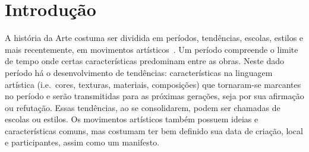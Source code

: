 



\chapter{Introdução}
\label{cap:intro} 

A história da Arte costuma ser dividida em períodos, tendências,
escolas, estilos e mais recentemente, em movimentos
artísticos~\cite{dempsey}. Um período compreende o limite de tempo
onde certas características predominam entre as obras. Neste dado
período há o desenvolvimento de tendências: características na
linguagem artística (i.e.\ cores, texturas, materiais, composições)
que tornaram-se marcantes no período e serão transmitidas para as
próximas gerações, seja por sua afirmação ou refutação. Essas
tendências, ao se consolidarem, podem ser chamadas de escolas ou
estilos. Os movimentos artísticos também possuem ideias e
características comuns, mas costumam ter bem definido sua data de
criação, local e participantes, assim como um manifesto.

